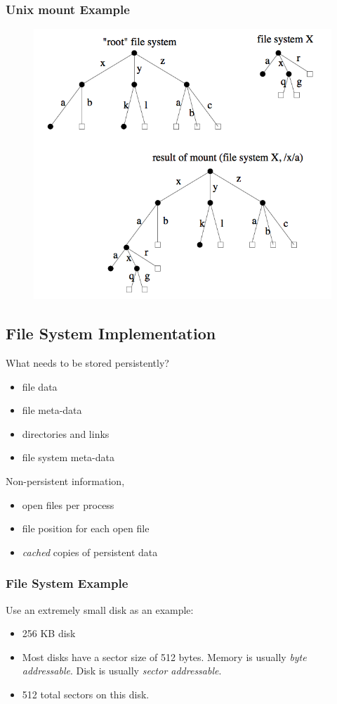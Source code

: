 \documentclass[12pt]{article}
\theoremstyle{plain}
\theoremstyle{definition}
\begin{document}
\subsubsection{Unix mount Example}
\begin{figure}[H]
  \centering
  \includegraphics[scale=0.9]{pictures/unix_mount.png}
\end{figure}

\subsection{File System Implementation}
What needs to be stored persistently?
\begin{itemize}
  \item file data
  \item file meta-data
  \item directories and links
  \item file system meta-data
\end{itemize}

Non-persistent information,
\begin{itemize}
  \item open files per process
  \item file position for each open file
  \item \emph{cached} copies of persistent data
\end{itemize}

\subsubsection{File System Example}
Use an extremely small disk as an example:
\begin{itemize}
  \item 256 KB disk
  \item Most disks have a sector size of 512 bytes.
  Memory is usually \emph{byte addressable}.
  Disk is usually \emph{sector addressable}.
  \item 512 total sectors on this disk.
\end{itemize}
\end{document}

